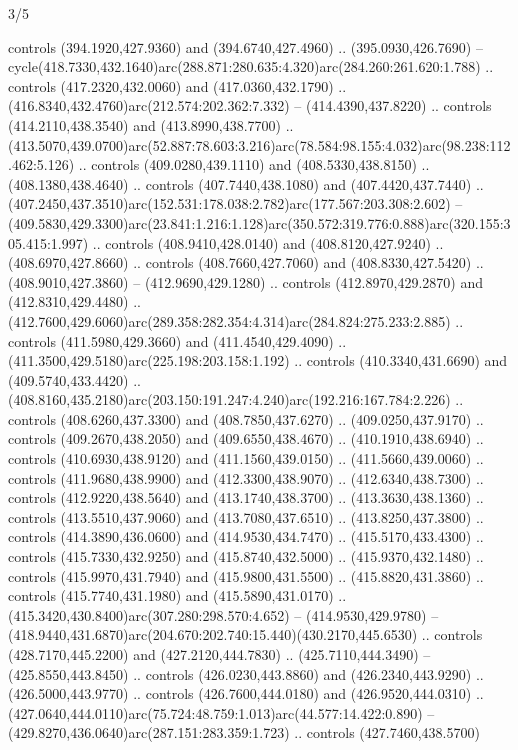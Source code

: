 \begin{flagdescription}{3/5}
\begin{scope}[shift={(0.5\flaglength,0.5\flagwidth)},scale=\flagwidth/510]
\begin{scope}[y=0.80pt, x=0.80pt, yscale=-1.06, xscale=1.06,yshift=-240pt,xshift=-400pt]
\begin{scope}[cm={{0.83333,0.0,0.0,0.83333,(154.64672,48.64761)}}]
\begin{scope}[cm={{0.93334,0.0,0.0,0.93334,(-4.86471,22.64035)}}]
\begin{scope}[draw=black]
  controls (394.1920,427.9360) and (394.6740,427.4960) .. (395.0930,426.7690) --
  cycle(418.7330,432.1640)arc(288.871:280.635:4.320)arc(284.260:261.620:1.788)
  .. controls (417.2320,432.0060) and (417.0360,432.1790) ..
  (416.8340,432.4760)arc(212.574:202.362:7.332) -- (414.4390,437.8220) ..
  controls (414.2110,438.3540) and (413.8990,438.7700) ..
  (413.5070,439.0700)arc(52.887:78.603:3.216)arc(78.584:98.155:4.032)arc(98.238:112.462:5.126)
  .. controls (409.0280,439.1110) and (408.5330,438.8150) .. (408.1380,438.4640)
  .. controls (407.7440,438.1080) and (407.4420,437.7440) ..
  (407.2450,437.3510)arc(152.531:178.038:2.782)arc(177.567:203.308:2.602) --
  (409.5830,429.3300)arc(23.841:1.216:1.128)arc(350.572:319.776:0.888)arc(320.155:305.415:1.997)
  .. controls (408.9410,428.0140) and (408.8120,427.9240) .. (408.6970,427.8660)
  .. controls (408.7660,427.7060) and (408.8330,427.5420) .. (408.9010,427.3860)
  -- (412.9690,429.1280) .. controls (412.8970,429.2870) and (412.8310,429.4480)
  .. (412.7600,429.6060)arc(289.358:282.354:4.314)arc(284.824:275.233:2.885) ..
  controls (411.5980,429.3660) and (411.4540,429.4090) ..
  (411.3500,429.5180)arc(225.198:203.158:1.192) .. controls (410.3340,431.6690)
  and (409.5740,433.4420) ..
  (408.8160,435.2180)arc(203.150:191.247:4.240)arc(192.216:167.784:2.226) ..
  controls (408.6260,437.3300) and (408.7850,437.6270) .. (409.0250,437.9170) ..
  controls (409.2670,438.2050) and (409.6550,438.4670) .. (410.1910,438.6940) ..
  controls (410.6930,438.9120) and (411.1560,439.0150) .. (411.5660,439.0060) ..
  controls (411.9680,438.9900) and (412.3300,438.9070) .. (412.6340,438.7300) ..
  controls (412.9220,438.5640) and (413.1740,438.3700) .. (413.3630,438.1360) ..
  controls (413.5510,437.9060) and (413.7080,437.6510) .. (413.8250,437.3800) ..
  controls (414.3890,436.0600) and (414.9530,434.7470) .. (415.5170,433.4300) ..
  controls (415.7330,432.9250) and (415.8740,432.5000) .. (415.9370,432.1480) ..
  controls (415.9970,431.7940) and (415.9800,431.5500) .. (415.8820,431.3860) ..
  controls (415.7740,431.1980) and (415.5890,431.0170) ..
  (415.3420,430.8400)arc(307.280:298.570:4.652) -- (414.9530,429.9780) --
  (418.9440,431.6870)arc(204.670:202.740:15.440)(430.2170,445.6530) .. controls
  (428.7170,445.2200) and (427.2120,444.7830) .. (425.7110,444.3490) --
  (425.8550,443.8450) .. controls (426.0230,443.8860) and (426.2340,443.9290) ..
  (426.5000,443.9770) .. controls (426.7600,444.0180) and (426.9520,444.0310) ..
  (427.0640,444.0110)arc(75.724:48.759:1.013)arc(44.577:14.422:0.890) --
  (429.8270,436.0640)arc(287.151:283.359:1.723) .. controls (427.7460,438.5700)

\end{scope}
\end{scope}
\end{scope}
\end{scope}
\end{scope}
\end{flagdescription}

